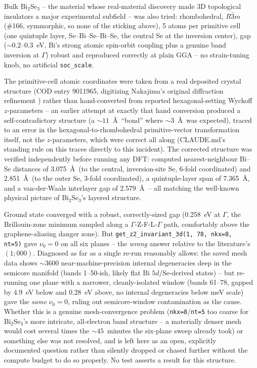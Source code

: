 \documentclass[11pt]{article}
\begin{document}
Bulk Bi$_2$Se$_3$ -- the material whose real-material discovery made 3D topological
insulators a major experimental subfield \cite{zhang2009,xia2009} -- was also tried:
rhombohedral, $R\bar3m$ (\#166, symmorphic, so none of the sticking above), 5 atoms per
primitive cell (one quintuple layer, Se--Bi--Se--Bi--Se, the central Se at the inversion
center), gap ($\sim0.2$--$0.3$~eV, Bi's strong atomic spin-orbit coupling plus a genuine
band inversion at $\Gamma$) robust and reproduced correctly at plain GGA
\cite{zhang2009} -- no strain-tuning knob, no artificial \texttt{soc\_scale}.

The primitive-cell atomic coordinates were taken from a real deposited crystal
structure (COD entry 9011965, digitizing Nakajima's original diffraction refinement
\cite{nakajima1963}) rather than hand-converted from reported hexagonal-setting Wyckoff
$z$-parameters -- an earlier attempt at exactly that hand conversion produced a
self-contradictory structure (a $\sim11$~\AA\ ``bond'' where $\sim3$~\AA\ was
expected), traced to an error in the hexagonal-to-rhombohedral primitive-vector
transformation itself, not the $z$-parameters, which were correct all along (CLAUDE.md's
standing rule on this traces directly to this incident). The corrected structure was
verified independently before running any DFT: computed nearest-neighbour Bi--Se
distances of 3.075~\AA\ (to the central, inversion-site Se, 6-fold coordinated) and
2.851~\AA\ (to the outer Se, 3-fold coordinated), a quintuple-layer span of 7.365~\AA,
and a van-der-Waals interlayer gap of 2.579~\AA\ -- all matching the well-known physical
picture of Bi$_2$Se$_3$'s layered structure.

Ground state converged with a robust, correctly-sized gap (0.258~eV at $\Gamma$, the
Brillouin-zone minimum sampled along a $\Gamma$-Z-F-L-$\Gamma$ path, comfortably above
the graphene-aliasing danger zone). But
\texttt{get\_z2\_invariant\_3d(1, 78, nkx=8, nt=5)} gave $\nu_0=0$ on all six planes --
the \emph{wrong} answer relative to the literature's $(1;000)$. Diagnosed as far as a
single re-run reasonably allows: the saved mesh data shows $\sim3600$
near-machine-precision internal degeneracies deep in the semicore manifold (bands
1--50-ish, likely flat Bi $5d$/Se-derived states) -- but re-running one plane with a
narrower, cleanly-isolated window (bands 61--78, gapped by 4.9~eV below and 0.28~eV
above, no internal degeneracies below meV scale) gave the \emph{same} $\nu_0=0$,
ruling out semicore-window contamination as the cause. Whether this is a genuine
mesh-convergence problem (\texttt{nkx=8}/\texttt{nt=5} too coarse for Bi$_2$Se$_3$'s
more intricate, all-electron band structure -- a materially denser mesh would cost
several times the $\sim45$~minutes the six-plane sweep already took) or something else
was not resolved, and is left here as an open, explicitly documented question rather
than silently dropped or chased further without the compute budget to do so properly.
No test asserts a result for this structure.
\end{document}
